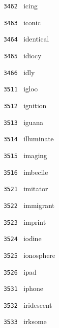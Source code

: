 \documentclass[11pt]{article}
\begin{document}
\begin{multicols}{6}
\noindent \texttt{ 3462 } \hspace{1mm} icing  \par
\noindent \texttt{ 3463 } \hspace{1mm} iconic  \par
\noindent \texttt{ 3464 } \hspace{1mm} identical  \par
\noindent \texttt{ 3465 } \hspace{1mm} idiocy  \par
\noindent \texttt{ 3466 } \hspace{1mm} idly  \par
\noindent \texttt{ 3511 } \hspace{1mm} igloo  \par
\noindent \texttt{ 3512 } \hspace{1mm} ignition  \par
\noindent \texttt{ 3513 } \hspace{1mm} iguana  \par
\noindent \texttt{ 3514 } \hspace{1mm} illuminate  \par
\noindent \texttt{ 3515 } \hspace{1mm} imaging  \par
\noindent \texttt{ 3516 } \hspace{1mm} imbecile  \par
\noindent \texttt{ 3521 } \hspace{1mm} imitator  \par
\noindent \texttt{ 3522 } \hspace{1mm} immigrant  \par
\noindent \texttt{ 3523 } \hspace{1mm} imprint  \par
\noindent \texttt{ 3524 } \hspace{1mm} iodine  \par
\noindent \texttt{ 3525 } \hspace{1mm} ionosphere  \par
\noindent \texttt{ 3526 } \hspace{1mm} ipad  \par
\noindent \texttt{ 3531 } \hspace{1mm} iphone  \par
\noindent \texttt{ 3532 } \hspace{1mm} iridescent  \par
\noindent \texttt{ 3533 } \hspace{1mm} irksome  \par

\end{multicols}
\end{document}
